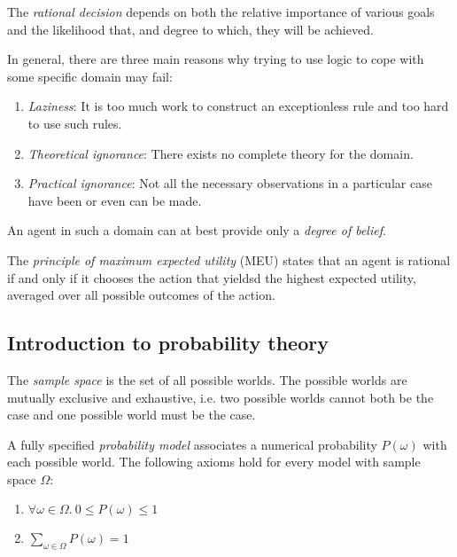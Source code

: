 \documentclass{article}
\begin{document}
\begin{definition}[R\&N p. 481]
    The \emph{rational decision} depends on both the relative importance of various goals and the
    likelihood that, and degree to which, they will be achieved.
\end{definition}

\begin{theorem}
    In general, there are three main reasons why trying to use logic
    to cope with some specific domain may fail:
    \begin{enumerate}
        \item \emph{Laziness}: It is too much work to construct an
              exceptionless rule and too hard to use such rules.
        \item \emph{Theoretical ignorance}: There exists no complete theory for the domain.
        \item \emph{Practical ignorance}: Not all the necessary observations
              in a particular case have been or even can be made.
    \end{enumerate}
    An agent in such a domain can at best provide only a \emph{degree of belief}.
\end{theorem}

\begin{definition}
    The \emph{principle of maximum expected utility} (MEU) states that an agent is rational
    if and only if it chooses the action that yieldsd the highest expected utility,
    averaged over all possible outcomes of the action.
\end{definition}

\subsection{Introduction to probability theory}

\renewcommand{\P}{\mathbf{P}}
\renewcommand{\vec}[1]{\mathbf{#1}}

\begin{definition}[R\&N p. 484]
    The \emph{sample space} is the set of all possible worlds.
    The possible worlds are mutually exclusive and exhaustive, i.e.
    two possible worlds cannot both be the case and one possible world must
    be the case.
\end{definition}

\begin{definition}
    A fully specified \emph{probability model} associates a numerical probability
    $P(\omega)$ with each possible world. The following axioms hold for every
    model with sample space $\Omega$:
    \begin{enumerate}[label=P\arabic*.]
        \item $\forall \omega\in\Omega.\:0\leq P(\omega)\leq 1$
        \item $\sum_{\omega\in\Omega} P(\omega)=1$
    \end{enumerate}
\end{definition}
\end{document}
